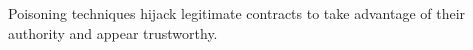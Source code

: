 Poisoning techniques hijack legitimate contracts to take advantage of their authority and appear trustworthy.

